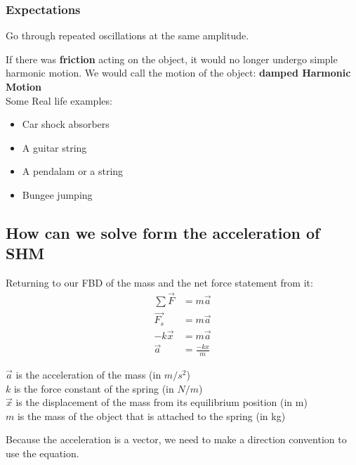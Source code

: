 \subsubsection{Expectations}
\begin{definition}
     Go through repeated oscillations at the same amplitude. 
\end{definition}

If there was \textbf{friction} acting on the object, it would no longer undergo simple harmonic motion. We would call the motion of the object: 
\textbf{damped Harmonic Motion}\\

Some Real life examples:
\begin{itemize}
    \item Car shock absorbers
    \item A guitar string
    \item A pendalam or a string
    \item Bungee jumping
\end{itemize}

\subsection{How can we solve form the acceleration of SHM}
Returning to our FBD of the mass and the net force statement from it:
\begin{align*}
    \sum \vec{F} &= m \vec{a}\\
    \vec{F_s} &= m\vec{a}\\
    -k\vec{x} &= m\vec{a}\\
    \vec{a} &= \frac{-kx}{m}
\end{align*}
\begin{center}
    $\vec{a}$ is the acceleration of the mass (in $m/s^2$)\\
    $k$ is the force constant of the spring (in $N/m$)\\
    $\vec{x}$ is the displacement of the mass from its equilibrium position (in m)\\
    $m$ is the mass of the object that is attached to the spring (in kg)
\end{center}

\begin{remark}
    Because the acceleration is a vector, we need to make a direction convention to use the equation. 
\end{remark}

